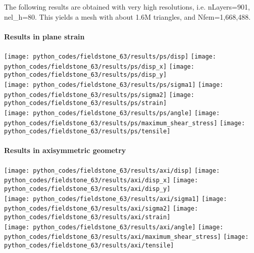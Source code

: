 The following results are obtained with very high resolutions, i.e. 
nLayers=901, nel\_h=80. This yields a mesh with about 1.6M triangles, 
and Nfem=1,668,488.

\newpage
\paragraph{Results in plane strain}


\begin{center}
\texttt{[image: python\_codes/fieldstone\_63/results/ps/disp]}
\texttt{[image: python\_codes/fieldstone\_63/results/ps/disp\_x]}
\texttt{[image: python\_codes/fieldstone\_63/results/ps/disp\_y]}\\
\texttt{[image: python\_codes/fieldstone\_63/results/ps/sigma1]}
\texttt{[image: python\_codes/fieldstone\_63/results/ps/sigma2]}
\texttt{[image: python\_codes/fieldstone\_63/results/ps/strain]}\\
\texttt{[image: python\_codes/fieldstone\_63/results/ps/angle]}
\texttt{[image: python\_codes/fieldstone\_63/results/ps/maximum\_shear\_stress]}
\texttt{[image: python\_codes/fieldstone\_63/results/ps/tensile]}
\end{center}

\newpage
\paragraph{Results in axisymmetric geometry}

\begin{center}
\texttt{[image: python\_codes/fieldstone\_63/results/axi/disp]}
\texttt{[image: python\_codes/fieldstone\_63/results/axi/disp\_x]}
\texttt{[image: python\_codes/fieldstone\_63/results/axi/disp\_y]}\\
\texttt{[image: python\_codes/fieldstone\_63/results/axi/sigma1]}
\texttt{[image: python\_codes/fieldstone\_63/results/axi/sigma2]}
\texttt{[image: python\_codes/fieldstone\_63/results/axi/strain]}\\
\texttt{[image: python\_codes/fieldstone\_63/results/axi/angle]}
\texttt{[image: python\_codes/fieldstone\_63/results/axi/maximum\_shear\_stress]}
\texttt{[image: python\_codes/fieldstone\_63/results/axi/tensile]}
\end{center}

